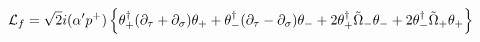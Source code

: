 \begin{equation}
{\cal L}_{f}=\sqrt{2}i(\alpha' p^{+})\left\{
\theta_{+}^{\dagger}(\partial_{\tau}+\partial_{\sigma})\theta_{+}
+\theta_{-}^{\dagger}(\partial_{\tau}-\partial_{\sigma})\theta_{-}
+2\theta_{+}^{\dagger}\tilde{\Omega}_{-}\theta_{-}
+2\theta_{-}^{\dagger}\tilde{\Omega}_{+}\theta_{+}\right\}
\end{equation}

